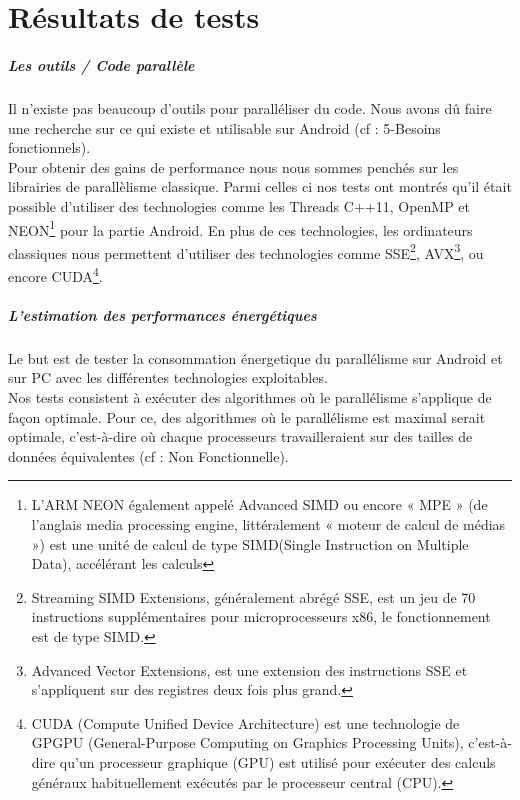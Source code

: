 \chapter{Résultats de tests}

\paragraph{Les outils / Code parallèle \\}

	Il n'existe pas beaucoup d'outils pour paralléliser du code. Nous avons dû faire une recherche sur ce qui existe et utilisable sur Android (cf : 5-Besoins fonctionnels). \\

	Pour obtenir des gains de performance nous nous sommes penchés sur les librairies de parallèlisme classique. Parmi celles ci nos tests ont montrés qu'il était possible d'utiliser des technologies comme les Threads C++11, OpenMP et NEON\footnote{L'ARM NEON également appelé Advanced SIMD ou encore « MPE » (de l'anglais media processing engine, littéralement « moteur de calcul de médias ») est une unité de calcul de type SIMD(Single Instruction on Multiple Data), accélérant les calculs} pour la partie Android. En plus de ces technologies, les ordinateurs classiques nous permettent d'utiliser des technologies comme SSE\footnote{Streaming SIMD Extensions, généralement abrégé SSE, est un jeu de 70 instructions supplémentaires pour microprocesseurs x86, le fonctionnement est de type SIMD.}, AVX\footnote{Advanced Vector Extensions, est une extension  des instructions SSE et s'appliquent sur des registres deux fois plus grand.}, ou encore CUDA\footnote{CUDA (Compute Unified Device Architecture) est une technologie de GPGPU (General-Purpose Computing on Graphics Processing Units), c'est-à-dire qu'un processeur graphique (GPU) est utilisé pour exécuter des calculs généraux habituellement exécutés par le processeur central (CPU).}.\\

\paragraph{L'estimation des performances énergétiques \\}

	Le but est de tester la consommation énergetique du parallélisme sur Android et sur PC avec les différentes technologies exploitables. \\

	Nos tests consistent à exécuter des algorithmes où le parallélisme s'applique de façon optimale. Pour ce, des algorithmes où le parallélisme est maximal serait optimale, c'est-à-dire où chaque processeurs travailleraient sur des tailles de données équivalentes (cf : Non Fonctionnelle).
